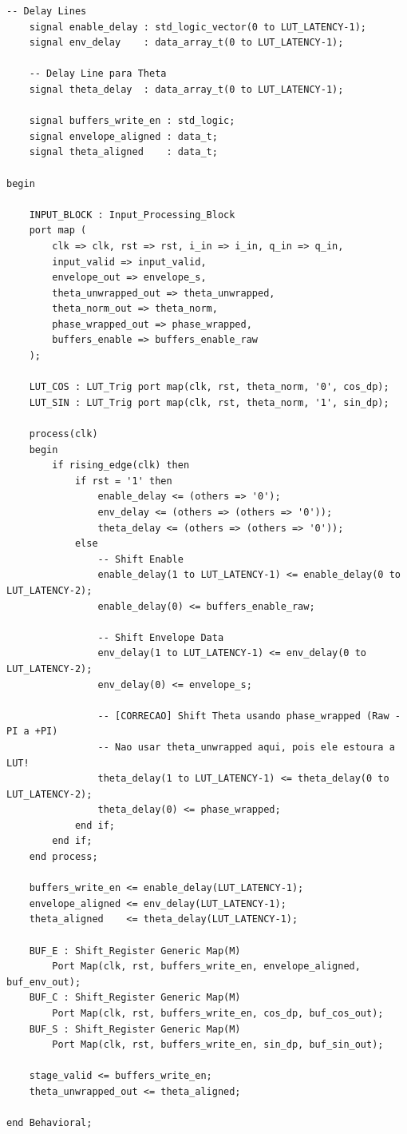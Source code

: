 \documentclass[a4paper,12pt]{article}
\begin{document}
\begin{lstlisting}[style=vhdlstyle,
    caption={C\'odigo VHDL completo do \texttt{Top\_NeuralNet\_S1}.},
    label={lst:top_s1}]
    -- Delay Lines
    signal enable_delay : std_logic_vector(0 to LUT_LATENCY-1);
    signal env_delay    : data_array_t(0 to LUT_LATENCY-1);

    -- Delay Line para Theta
    signal theta_delay  : data_array_t(0 to LUT_LATENCY-1);

    signal buffers_write_en : std_logic;
    signal envelope_aligned : data_t;
    signal theta_aligned    : data_t;

begin

    INPUT_BLOCK : Input_Processing_Block
    port map (
        clk => clk, rst => rst, i_in => i_in, q_in => q_in,
        input_valid => input_valid,
        envelope_out => envelope_s,
        theta_unwrapped_out => theta_unwrapped,
        theta_norm_out => theta_norm,
        phase_wrapped_out => phase_wrapped,
        buffers_enable => buffers_enable_raw
    );

    LUT_COS : LUT_Trig port map(clk, rst, theta_norm, '0', cos_dp);
    LUT_SIN : LUT_Trig port map(clk, rst, theta_norm, '1', sin_dp);

    process(clk)
    begin
        if rising_edge(clk) then
            if rst = '1' then
                enable_delay <= (others => '0');
                env_delay <= (others => (others => '0'));
                theta_delay <= (others => (others => '0'));
            else
                -- Shift Enable
                enable_delay(1 to LUT_LATENCY-1) <= enable_delay(0 to LUT_LATENCY-2);
                enable_delay(0) <= buffers_enable_raw;

                -- Shift Envelope Data
                env_delay(1 to LUT_LATENCY-1) <= env_delay(0 to LUT_LATENCY-2);
                env_delay(0) <= envelope_s;

                -- [CORRECAO] Shift Theta usando phase_wrapped (Raw -PI a +PI)
                -- Nao usar theta_unwrapped aqui, pois ele estoura a LUT!
                theta_delay(1 to LUT_LATENCY-1) <= theta_delay(0 to LUT_LATENCY-2);
                theta_delay(0) <= phase_wrapped;
            end if;
        end if;
    end process;

    buffers_write_en <= enable_delay(LUT_LATENCY-1);
    envelope_aligned <= env_delay(LUT_LATENCY-1);
    theta_aligned    <= theta_delay(LUT_LATENCY-1);

    BUF_E : Shift_Register Generic Map(M)
        Port Map(clk, rst, buffers_write_en, envelope_aligned, buf_env_out);
    BUF_C : Shift_Register Generic Map(M)
        Port Map(clk, rst, buffers_write_en, cos_dp, buf_cos_out);
    BUF_S : Shift_Register Generic Map(M)
        Port Map(clk, rst, buffers_write_en, sin_dp, buf_sin_out);

    stage_valid <= buffers_write_en;
    theta_unwrapped_out <= theta_aligned;

end Behavioral;
\end{lstlisting}
\end{document}
